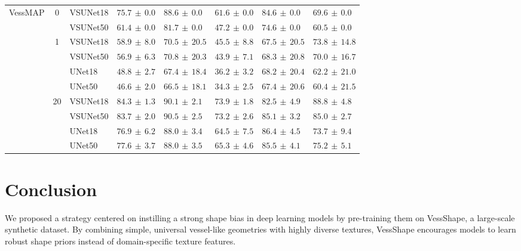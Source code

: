 \documentclass[%
reprint,
nofootinbib,
 amsmath,amssymb,
aps,
superscriptaddress,
showkeys,
longbibliography
]{revtex4-1}
\begin{document}
\begin{table}[t]
\begin{tabular}{l c l l l l l l}
        \hline
        \multirow{10}{*}{VessMAP} & \multirow{2}{*}{0} & VSUNet18 & $75.7 \,\pm\, 0.0$ & $88.6 \,\pm\, 0.0$ & $61.6 \,\pm\, 0.0$ & $84.6 \,\pm\, 0.0$ & $69.6 \,\pm\, 0.0$ \\
         &  & VSUNet50 & $61.4 \,\pm\, 0.0$ & $81.7 \,\pm\, 0.0$ & $47.2 \,\pm\, 0.0$ & $74.6 \,\pm\, 0.0$ & $60.5 \,\pm\, 0.0$ \\
         \cline{2-8}
         & \multirow{4}{*}{1} & VSUNet18 & $58.9 \,\pm\, 8.0$ & $70.5 \,\pm\, 20.5$ & $45.5 \,\pm\, 8.8$ & $67.5 \,\pm\, 20.5$ & $73.8 \,\pm\, 14.8$ \\
         &  & VSUNet50 & $56.9 \,\pm\, 6.3$ & $70.8 \,\pm\, 20.3$ & $43.9 \,\pm\, 7.1$ & $68.3 \,\pm\, 20.8$ & $70.0 \,\pm\, 16.7$ \\
         &  & UNet18 & $48.8 \,\pm\, 2.7$ & $67.4 \,\pm\, 18.4$ & $36.2 \,\pm\, 3.2$ & $68.2 \,\pm\, 20.4$ & $62.2 \,\pm\, 21.0$ \\
         &  & UNet50 & $46.6 \,\pm\, 2.0$ & $66.5 \,\pm\, 18.1$ & $34.3 \,\pm\, 2.5$ & $67.4 \,\pm\, 20.6$ & $60.4 \,\pm\, 21.5$ \\
         \cline{2-8}
         & \multirow{4}{*}{20} & VSUNet18 & $84.3 \,\pm\, 1.3$ & $90.1 \,\pm\, 2.1$ & $73.9 \,\pm\, 1.8$ & $82.5 \,\pm\, 4.9$ & $88.8 \,\pm\, 4.8$ \\
         &  & VSUNet50 & $83.7 \,\pm\, 2.0$ & $90.5 \,\pm\, 2.5$ & $73.2 \,\pm\, 2.6$ & $85.1 \,\pm\, 3.2$ & $85.0 \,\pm\, 2.7$ \\
         &  & UNet18 & $76.9 \,\pm\, 6.2$ & $88.0 \,\pm\, 3.4$ & $64.5 \,\pm\, 7.5$ & $86.4 \,\pm\, 4.5$ & $73.7 \,\pm\, 9.4$ \\
         &  & UNet50 & $77.6 \,\pm\, 3.7$ & $88.0 \,\pm\, 3.5$ & $65.3 \,\pm\, 4.6$ & $85.5 \,\pm\, 4.1$ & $75.2 \,\pm\, 5.1$ \\
        \hline
    \end{tabular}
    \endgroup
\end{table}


\section{Conclusion}
\label{s:conclusion}

We proposed a strategy centered on instilling a strong shape bias in deep learning models by pre-training them on VessShape, a large-scale synthetic dataset. By combining simple, universal vessel-like geometries with highly diverse textures, VessShape encourages models to learn robust shape priors instead of domain-specific texture features.
\end{document}
